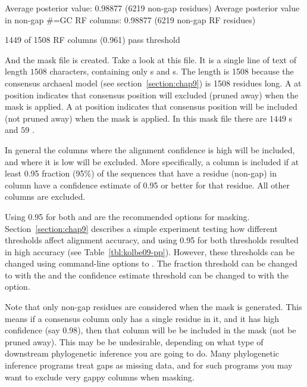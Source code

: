 \begin{sreoutput}
Average posterior value:                            0.98877 (6219 non-gap residues)
Average posterior value in non-gap #=GC RF columns: 0.98877 (6219 non-gap RF residues)

1449 of 1508 RF columns (0.961) pass threshold
\end{sreoutput}

And the mask file  is created. Take a look at this
file. It is a single line of text of length $1508$ characters,
containing only s and s. The length is 1508 because
the consensus archaeal model (see section~\ref{section:chap9}) is 1508 residues
long. A  at position  indicates that consensus position 
will excluded (pruned away) when the mask is applied. A  at
position  indicates that consensus position  will be included (not
pruned away) when the mask is applied. In this mask file there are
$1449$ s and $59$ .

In general the columns where the alignment confidence is high will be
included, and where it is low will be excluded. More specifically, a
column  is included if at least 0.95 fraction (95\%)
of the sequences that have a residue (non-gap) in column  have a
confidence estimate of 0.95 or better for that residue. All other
columns are excluded.

Using 0.95 for both  and  are the
recommended options for masking. Section~\ref{section:chap9} 
describes a simple experiment testing how different thresholds affect
alignment accuracy, and using 0.95 for both thresholds resulted in 
high accuracy (see Table~\ref{tbl:kolbe09-pp}).
However, these thresholds can be changed using command-line options to 
. The fraction threshold can be changed to
 with the  and the confidence estimate
threshold can be changed to  with the 
option.

Note that only non-gap residues are considered when the mask is
generated. This means if a consensus column only has a single residue
in it, and it has high confidence (say 0.98), then that column will be
be included in the mask (not be pruned away). This may be be
undesirable, depending on what type of downstream phylogenetic inference
you are going to do. Many phylogenetic inference programs treat gaps
as missing data, and for such programs you may want to exclude very gappy
columns when masking. 

